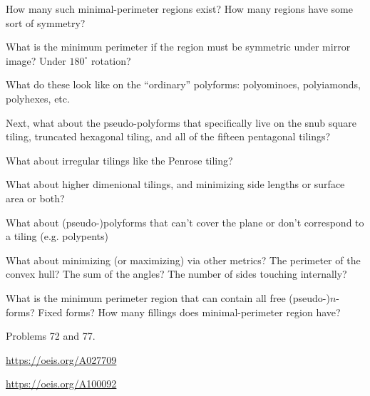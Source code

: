 \documentclass{article}
\begin{document}
\begin{related}
  \item How many such minimal-perimeter regions exist? How many regions have
  some sort of symmetry?
  \item What is the minimum perimeter if the region must be symmetric under
  mirror image? Under $180^\circ$ rotation?
  \item What do these look like on the ``ordinary'' polyforms:
  polyominoes, polyiamonds, polyhexes, etc.
  \item Next, what about the pseudo-polyforms that specifically live on the
  snub square tiling, truncated hexagonal tiling, and all of the fifteen
  pentagonal tilings?
  \item What about irregular tilings like the Penrose tiling?
  \item What about higher dimenional tilings, and minimizing side lengths or
  surface area or both?
  \item What about (pseudo-)polyforms that can't cover the plane or don't
  correspond to a tiling (e.g. polypents)
  \item What about minimizing (or maximizing) via other metrics?
  The perimeter of the convex hull? The sum of the angles? The number of
  sides touching internally?
  \item What is the minimum perimeter region that can contain all free
  (pseudo-)$n$-forms? Fixed forms?
  How many fillings does minimal-perimeter region have?
\end{related}
\begin{references}
  \item Problems 72 and 77.
  \item \url{https://oeis.org/A027709}
  \item \url{https://oeis.org/A100092}
\end{references}
\end{document}
